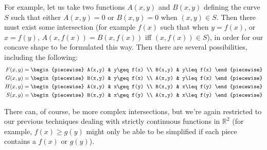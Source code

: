 For example, let us take two functions $A(x,y)$ and $B(x,y)$ defining the curve $S$ such that either $A(x,y)=0$ or $B(x,y)=0$ when $(x,y)\in S$. Then there must exist some intersection (for example $f(x)$ such that when $y=f(x)$, or $x=f(y)$, $A(x,f(x))=B(x,f(x))$ iff $(x,f(x))\in S$), in order for our concave shape to be formulated this way. Then there are several possibilities, including the following:
\begin{align*}
    F(x,y) &= \begin{piecewise}
        A(x,y) & y\geq f(x) \\
        B(x,y) & y\leq f(x)
    \end{piecewise} \\
    G(x,y) &= \begin{piecewise}
        B(x,y) & y\geq f(x) \\
        A(x,y) & y\leq f(x)
    \end{piecewise} \\
    H(x,y) &= \begin{piecewise}
        A(x,y) & x\geq f(y) \\
        B(x,y) & x\leq f(y)
    \end{piecewise} \\
    S(x,y) &= \begin{piecewise}
        B(x,y) & x\geq f(y) \\
        A(x,y) & x\leq f(y)
    \end{piecewise} \\
\end{align*}

There can, of course, be more complex intersections, but we're again restricted to our previous techniques dealing with strictly continuous functions in $\mathbb{R}^2$ (for example, $f(x)\geq g(y)$ might only be able to be simplified if each piece contains a $f(x)$ or $g(y)$).


